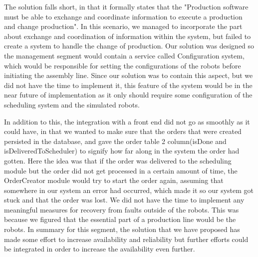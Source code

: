 The solution falls short, in that it formally states that the "Production software must be able to exchange and coordinate information to execute a production and change production". In this scenario, we managed to incorporate the part about exchange and coordination of information within the system, but failed to create a system to handle the change of production. Our solution was designed so the management segment would contain a service called Configuration system, which would be responsible for setting the configurations of the robots before initiating the assembly line. Since our solution was to contain this aspect, but we did not have the time to implement it, this feature of the system would be in the near future of implementation as it only should require some configuration of the scheduling system and the simulated robots.

In addition to this, the integration with a front end did not go as smoothly as it could have, in that we wanted to make sure that the orders that were created persisted in the database, and gave the order table 2 column(isDone and isDeliveredToScheduler) to signify how far along in the system the order had gotten. Here the idea was that if the order was delivered to the scheduling module but the order did not get processed in a certain amount of time, the OrderCreator module would try to start the order again, assuming that somewhere in our system an error had occurred, which made it so our system got stuck and that the order was lost. We did not have the time to implement any meaningful measures for recovery from faults outside of the robots. This was because we figured that the essential part of a production line would be the robots. In summary for this segment, the solution that we have proposed has made some effort to increase availability and reliability but further efforts could be integrated in order to increase the availability even further.